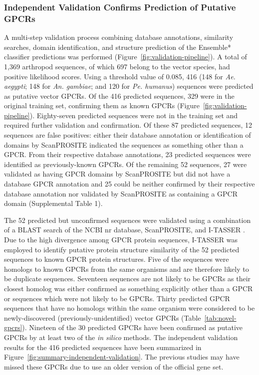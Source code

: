 \subsubsection{Independent Validation Confirms Prediction of Putative GPCRs}

A multi-step validation process combining database annotations, similarity searches, domain identification, and structure prediction of the Ensemble* classifier predictions was performed (Figure~\ref{fig:validation-pipeline}). A total of 1,369 arthropod sequences, of which 697 belong to the vector species, had positive likelihood scores.  Using a threshold value of 0.085, 416 (148 for \emph{Ae. aegypti}; 148 for \emph{An. gambiae}; and 120 for \emph{Pe. humanus}) sequences were predicted as putative vector GPCRs. Of the 416 predicted sequences, 329 were in the original training set, confirming them as known GPCRs (Figure~\ref{fig:validation-pipeline}). Eighty-seven predicted sequences were not in the training set and required further validation and confirmation.  Of these 87 predicted sequences, 12 sequences are false positives: either their database annotation or identification of domains by ScanPROSITE \cite{DeCastro2006} indicated the sequences as something other than a GPCR.  From their respective database annotations, 23 predicted sequences were identified as previously-known GPCRs. Of the remaining 52 sequences, 27 were validated as having GPCR domains by ScanPROSITE but did not have a database GPCR annotation and 25 could be neither confirmed by their respective database annotation nor validated by ScanPROSITE as containing a GPCR domain (Supplemental Table 1).

The 52 predicted but unconfirmed sequences were validated using a combination of a BLAST search of the NCBI nr database, ScanPROSITE, and I-TASSER \cite{Zhang2007}.  Due to the high divergence among GPCR protein sequences, I-TASSER was employed to identify putative protein structure similarity of the 52 predicted sequences to known GPCR protein structures. Five of the sequences were homologs to known GPCRs from the same organisms and are therefore likely to be duplicate sequences. Seventeen sequences are not likely to be GPCRs as their closest homolog was either confirmed as something explicitly other than a GPCR or sequences which were not likely to be GPCRs. Thirty predicted GPCR sequences that have no homologs within the same organism were considered to be newly-discovered (previously-unidentified) vector GPCRs (Table~\ref{tab:novel-gpcrs}). Nineteen of the 30 predicted GPCRs have been confirmed as putative GPCRs by at least two of the \textit{in silico} methods. The independent validation results for the 416 predicted sequences have been summarized in Figure~\ref{fig:summary-independent-validation}. The previous studies may have missed these GPCRs due to use an older version of the official gene set.

